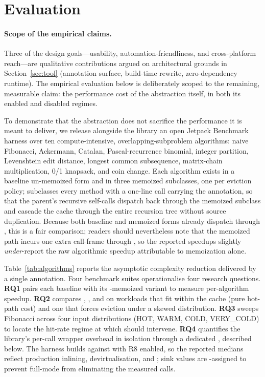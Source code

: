 \section{Evaluation}\label{sec:eval}



\paragraph{Scope of the empirical claims.} Three of the design goals---usability, automation-friendliness, and cross-platform reach---are qualitative contributions argued on architectural grounds in Section~\ref{sec:tool} (annotation surface, build-time rewrite, zero-dependency runtime). The empirical evaluation below is deliberately scoped to the remaining, measurable claim: the performance cost of the abstraction itself, in both its enabled and disabled regimes.

To demonstrate that the abstraction does not sacrifice the performance it is meant to deliver, we release alongside the library an open Jetpack Benchmark~\cite{jetpackbenchmark} harness over ten compute-intensive, overlapping-subproblem algorithms: naive Fibonacci, Ackermann, Catalan, Pascal-recurrence binomial, integer partition, Levenshtein edit distance, longest common subsequence, matrix-chain multiplication, 0/1 knapsack, and coin change. Each algorithm exists in a baseline un-memoized form and in three memoized subclasses, one per eviction policy; subclasses  every method with a one-line  call carrying the  annotation, so that the parent's recursive  self-calls dispatch back through the memoized subclass and cascade the cache through the entire recursion tree without source duplication. Because both baseline and memoized forms already dispatch through , this is a fair comparison; readers should nevertheless note that the memoized path incurs one extra call-frame through , so the reported speedups slightly \emph{under}-report the raw algorithmic speedup attributable to memoization alone.

Table~\ref{tab:algorithms} reports the asymptotic complexity reduction delivered by a single  annotation. Four benchmark suites operationalise four research questions. \textbf{RQ1} pairs each baseline with its \lru-memoized variant to measure per-algorithm speedup. \textbf{RQ2} compares \lru, \fifo, and \lfu on workloads that fit within the cache (pure hot-path cost) and one that forces eviction under a skewed distribution. \textbf{RQ3} sweeps Fibonacci across four input distributions (HOT, WARM, COLD, VERY\_COLD) to locate the hit-rate regime at which  should intervene. \textbf{RQ4} quantifies the library's per-call wrapper overhead in isolation through a dedicated , described below. The harness builds against  with R8 enabled, so the reported medians reflect production inlining, devirtualisation, and \dce; sink values are -assigned to prevent full-mode \dce from eliminating the measured calls.

